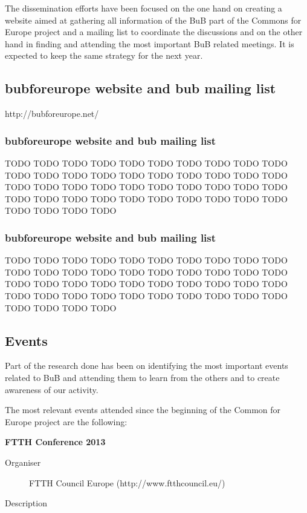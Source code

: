 The dissemination efforts have been focused on the one hand on creating a website aimed at gathering all information of the BuB part of the Commons for Europe project and a mailing list to coordinate the discussions and on the other hand in finding and attending the most important BuB related meetings. It is expected to keep the same strategy for the next year.

\subsection{bubforeurope website and bub mailing list}

http://bubforeurope.net/

\subsubsection{bubforeurope website and bub mailing list}

TODO TODO TODO TODO TODO TODO TODO TODO TODO TODO TODO TODO TODO TODO TODO TODO TODO TODO TODO TODO TODO TODO TODO TODO TODO TODO TODO TODO TODO TODO TODO TODO TODO TODO TODO TODO TODO TODO TODO TODO TODO TODO TODO TODO 

\subsubsection{bubforeurope website and bub mailing list}

TODO TODO TODO TODO TODO TODO TODO TODO TODO TODO TODO TODO TODO TODO TODO TODO TODO TODO TODO TODO TODO TODO TODO TODO TODO TODO TODO TODO TODO TODO TODO TODO TODO TODO TODO TODO TODO TODO TODO TODO TODO TODO TODO TODO 

\subsection{Events}

Part of the research done has been on identifying the most important events related to BuB and attending them to learn from the others and to create awareness of our activity.

The most relevant events attended since the beginning of the Common for Europe project are the following:

\textbf{FTTH Conference 2013}
\begin{description}
 \item[Organiser] FTTH Council Europe (http://www.ftthcouncil.eu/)
 \item[Description] 
\end{description}

